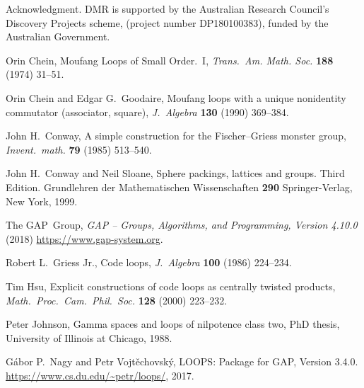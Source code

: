 \documentclass{article}
\theoremstyle{plain}
\theoremstyle{definition}
\newtheorem*{definition}{Definition}
\newtheorem*{remark}{Remark}
\begin{document}



\begin{acknowledgment}{Acknowledgment.}
DMR is supported by the Australian Research Council's Discovery Projects scheme, (project number DP180100383), funded by the Australian Government.
\end{acknowledgment}

\begin{thebibliography}{1}
 Orin Chein, Moufang Loops of Small Order.\ I, \emph{Trans.\ Am. Math. Soc.} \textbf{188} (1974) 31--51.

 Orin Chein and Edgar G.\ Goodaire, Moufang loops with a unique nonidentity commutator (associator, square), \emph{J.\ Algebra} \textbf{130} (1990) 369--384.

 John H.\ Conway, A simple construction for the Fischer--Griess monster group, \emph{Invent.\ math.} \textbf{79} (1985) 513--540.

 John H.\ Conway and Neil Sloane, Sphere packings, lattices and groups. Third Edition. Grundlehren der Mathematischen Wissenschaften \textbf{290} Springer-Verlag, New York, 1999.

 The GAP~Group, \emph{GAP -- Groups, Algorithms, and Programming, Version 4.10.0} (2018) \url{https://www.gap-system.org}.

 Robert L.\ Griess Jr., Code loops, \emph{J.\ Algebra} \textbf{100} (1986) 224--234.

 Tim Hsu, Explicit constructions of code loops as centrally twisted products, \emph{Math.\ Proc.\ Cam.\ Phil.\ Soc.} \textbf{128} (2000) 223--232.

 Peter Johnson, Gamma spaces and loops of nilpotence class two, PhD thesis, University of Illinois at Chicago, 1988.

 G\'abor P.\ Nagy and Petr Vojt\v{e}chovsk\'{y}, LOOPS: Package for GAP, Version 3.4.0. \url{https://www.cs.du.edu/~petr/loops/}, 2017.


\end{thebibliography}
\end{document}
